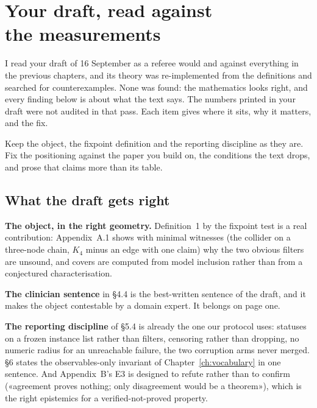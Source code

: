 \chapter[Your draft, read against the measurements]{Your draft, read against\\ the measurements}
\label{ch:review}

I read your draft of 16 September as a referee would and against everything in the previous chapters, and
its theory was re-implemented from the definitions and searched for counterexamples. None was found: the
mathematics looks right, and every finding below is about what the text says. The numbers printed in your
draft were not audited in that pass. Each item gives where it sits, why it matters, and the fix.

\begin{ideia}
Keep the object, the fixpoint definition and the reporting discipline as they are. Fix the positioning
against the paper you build on, the conditions the text drops, and prose that claims more than its table.
\end{ideia}

\begin{antes}
\end{antes}

\section{What the draft gets right}

\textbf{The object, in the right geometry.} Definition~1 by the fixpoint test is a real contribution:
Appendix~A.1 shows with minimal witnesses (the collider on a three-node chain, $K_4$ minus an edge with
one claim) why the two obvious filters are unsound, and covers are computed from model inclusion rather
than from a conjectured characterisation.

\textbf{The clinician sentence} in \S4.4 is the best-written sentence of the draft, and it makes the
object contestable by a domain expert. It belongs on page one.

\textbf{The reporting discipline} of \S5.4 is already the one our protocol uses: statuses on a frozen
instance list rather than filters, censoring rather than dropping, no numeric radius for an unreachable
failure, the two corruption arms never merged. \S6 states the observables-only invariant of
Chapter~\ref{ch:vocabulary} in one sentence. And Appendix~B's E3 is designed to refute rather than to
confirm («agreement proves nothing; only disagreement would be a theorem»), which is the right
epistemics for a verified-not-proved property.

